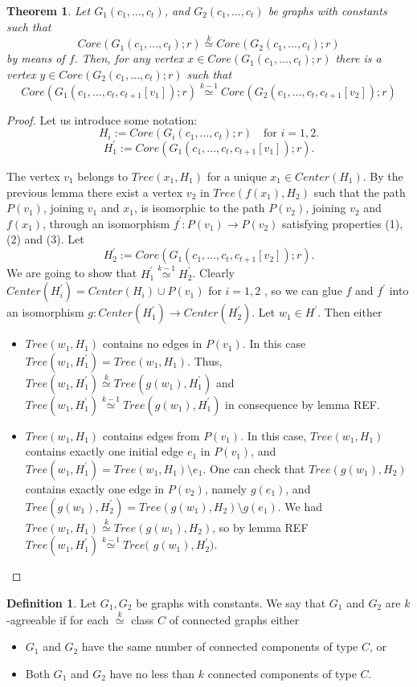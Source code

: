 \documentclass[11pt,notitlepage]{report}
\newtheorem{theorem}{Theorem}[chapter]
\theoremstyle{definition}
\newtheorem{definition}{Definition}[chapter]
\newcommand{\morph}[1]{\stackrel{#1}{\simeq}}
\begin{document}
\begin{theorem} 
	Let $G_1(c_1,\dots, c_t)$, and $G_2(c_1,\dots,c_t)$ be graphs
	with constants such that 
	\[ Core(G_1(c_1,\dots, c_t);r)\morph{k} Core(G_2(c_1,\dots,c_t);r)\]
	by means of $f$. 
	Then, for any vertex $x\in Core(G_1(c_1,\dots, c_t);r)$ there is a vertex
	$y\in Core(G_2(c_1,\dots, c_t);r)$ such that 
	\[Core(G_1(c_1,\dots, c_t,c_{t+1}[v_1]);r)\morph{k-1} Core(G_2(c_1,\dots,c_t,c_{t+1}[v_2]);r)\]
\end{theorem}
\begin{proof}
	Let us introduce some notation:
	\[H_i:=Core(G_i(c_1,\dots, c_t);r)\quad \text{for }i=1,2. \]
	\[H^\prime_1:=Core(G_1(c_1,\dots, c_t,c_{t+1}[v_1]);r).\]
	
	The vertex $v_1$ belongs to $Tree(x_1,H_1)$
	for a unique $x_1\in Center(H_1)$. By the previous lemma there exist a vertex $v_2$ in 
	$Tree(f(x_1),H_2)$ such that the path $P(v_1)$, 
	joining $v_1$ and $x_1$, is isomorphic to the path
	$P(v_2)$, joining $v_2$ and $f(x_1)$, through an isomorphism $f^\prime: P(v_1)
	\rightarrow P(v_2)$ satisfying properties (1), (2) and (3). 
	Let 
	\[H^\prime_2:=Core(G_1(c_1,\dots, c_t,c_{t+1}[v_2]);r).\]
	We are going to show that $H^\prime_1\morph{k-1}H^\prime_2$.
	Clearly $Center(H^\prime_i)=Center(H_i)\cup P(v_1)$ for $i=1,2$ , so we can glue
	$f$ and $f^\prime$ into an isomorphism $g:Center(H^\prime_1)\rightarrow Center(H^\prime_2)$.
	Let $w_1\in H^\prime$. Then either
	\begin{itemize}
		\item $Tree(w_1,H_1)$ contains no edges in $P(v_1)$. 
		In this case $Tree(w_1,H^\prime_1)=Tree(w_1,H_1)$.
		Thus, $Tree(w_1,H^\prime_1)\morph{k} Tree(g(w_1),H^\prime_1)$
		and $Tree(w_1,H^\prime_1)\morph{k-1} Tree(g(w_1),H^\prime_1)$
		in consequence by lemma REF.
		\item $Tree(w_1,H_1)$ contains edges from $P(v_1)$.
		In this case, $Tree(w_1,H_1)$ contains exactly one initial edge
		$e_1$ in $P(v_1)$, and $Tree(w_1,H^\prime_1)=Tree(w_1,H_1)\setminus e_1$.
		One can check that $Tree(g(w_1),H_2)$ contains exactly one edge
		in $P(v_2)$, namely $g(e_1)$, and 
		$Tree(g(w_1),H^\prime_2)=Tree(g(w_1),H_2)\setminus g(e_1)$.
		We had $Tree(w_1,H_1)\morph{k}Tree(g(w_1),H_2)$, so by lemma REF
		$Tree(w_1,H^\prime_1)\morph{k-1}Tree($ $g(w_1),H^\prime_2)$.	
	\end{itemize}
\end{proof}


\begin{definition}
	Let $G_1,G_2$ be graphs with constants. We say that $G_1$ and $G_2$ are
	$k$-agreeable if for each $\morph{k}$ class $C$ of connected graphs either
	\begin{itemize}
		\item $G_1$ and $G_2$ have the same number of connected components of type $C$, or
		\item Both $G_1$ and $G_2$ have no less than $k$ connected components of type $C$.
	\end{itemize} 
\end{definition}
\end{document}
